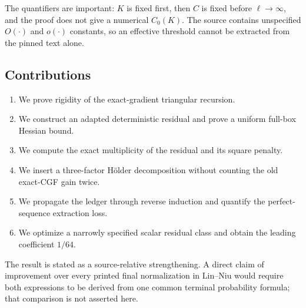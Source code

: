 The quantifiers are important: \(K\) is fixed first, then \(C\) is fixed
before \(\ell\to\infty\), and the proof does not give a numerical \(C_0(K)\).
The source contains unspecified
\(O(\cdot)\) and \(o(\cdot)\) constants, so an effective threshold cannot be
extracted from the pinned text alone.

\subsection{Contributions}

\begin{enumerate}[label=(\roman*)]
\item We prove rigidity of the exact-gradient triangular recursion.
\item We construct an adapted deterministic residual and prove a uniform
      full-box Hessian bound.
\item We compute the exact multiplicity of the residual and its square
      penalty.
\item We insert a three-factor H\"older decomposition without counting the
      old exact-CGF gain twice.
\item We propagate the ledger through reverse induction and quantify the
      perfect-sequence extraction loss.
\item We optimize a narrowly specified scalar residual class and obtain the
      leading coefficient \(1/64\).
\end{enumerate}

The result is stated as a source-relative strengthening.  A direct claim of
improvement over every printed final normalization in Lin--Niu would require
both expressions to be derived from one common terminal probability formula;
that comparison is not asserted here.
